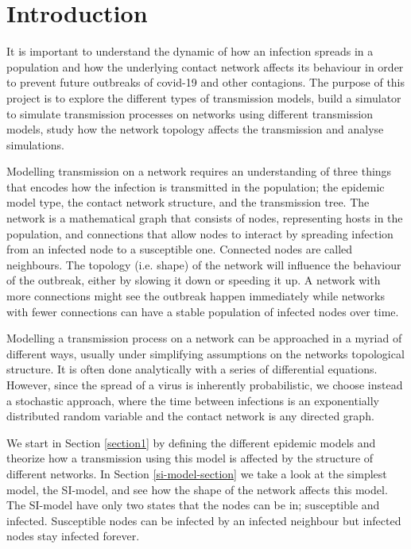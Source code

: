 \documentclass[12pt]{article} %
\numberwithin{equation}{section}
\begin{document}
\newpage
\thispagestyle{empty}
\tableofcontents %


\newpage
\setcounter{page}{1}
\section{Introduction}
It is important to understand the dynamic of how an infection spreads in a population and how the underlying contact network affects its behaviour in order to prevent future outbreaks of covid-19 and other contagions. The purpose of this project is to explore the different types of transmission models, build a simulator to simulate transmission processes on networks using different transmission models, study how the network topology affects the transmission and analyse simulations.

Modelling transmission on a network requires an understanding of three things that encodes how the infection is transmitted in the population; the epidemic model type, the contact network structure, and the transmission tree. The network is a mathematical graph that consists of nodes, representing hosts in the population, and connections that allow nodes to interact by spreading infection from an infected node to a susceptible one. Connected nodes are called neighbours. The topology (i.e. shape) of the network will influence the behaviour of the outbreak, either by slowing it down or speeding it up. A network with more connections might see the outbreak happen immediately while networks with fewer connections can have a stable population of infected nodes over time.

Modelling a transmission process on a network can be approached in a myriad of different ways, usually under simplifying assumptions on the networks topological structure. It is often done analytically with a series of differential equations. However, since the spread of a virus is inherently probabilistic, we choose instead a stochastic approach, where the time between infections is an exponentially distributed random variable and the contact network is any directed graph. 

We start in Section \ref{section1} by defining the different epidemic models and theorize how a transmission using this model is affected by the structure of different networks. In Section \ref{si-model-section} we take a look at the simplest model, the SI-model, and see how the shape of the network affects this model. The SI-model have only two states that the nodes can be in; susceptible and infected. Susceptible nodes can be infected by an infected neighbour but infected nodes stay infected forever.
\end{document}
